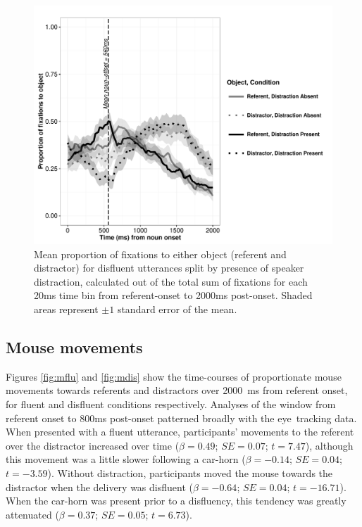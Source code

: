 \documentclass[a4paper,man,natbib]{apa6}
\newcommand*{\SE}{\mathit{SE}} %
\begin{document}
\begin{figure}[Ht] %
  \centering
	\includegraphics[width=\linewidth]{v2_eyedisf.pdf}
  \caption{Mean proportion of fixations to either object (referent and distractor) for disfluent utterances split by presence of speaker distraction, calculated out of the total sum of fixations for each 20ms time bin from referent-onset to 2000ms post-onset. Shaded areas represent $\pm 1$ standard error of the mean.}
  \label{fig:diseye}
\end{figure}

\subsection{Mouse movements}
Figures \ref{fig:mflu} and \ref{fig:mdis} show the time-courses of proportionate mouse movements towards referents and distractors over 2000~ms from referent onset, for fluent and disfluent conditions respectively. 
Analyses of the window from referent onset to 800ms post-onset patterned broadly with the eye~tracking data. 
When presented with a fluent utterance, participants' movements to the referent over the distractor increased over time ($\beta = 0.49$; $\SE = 0.07$; $t=7.47$), although this movement was a little slower following a car-horn ($\beta = -0.14$; $\SE = 0.04$; $t=-3.59$).
Without distraction, participants moved the mouse towards the distractor when the delivery was disfluent ($\beta = -0.64$; $\SE = 0.04$; $t=-16.71$). 
When the car-horn was present prior to a disfluency, this tendency was greatly attenuated ($\beta = 0.37$; $\SE = 0.05$; $t=6.73$). 
\end{document}
